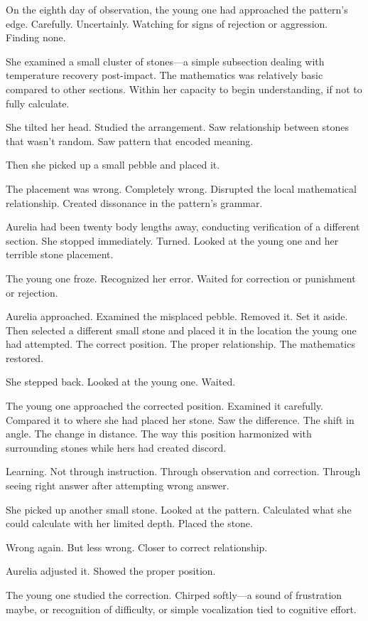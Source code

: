 On the eighth day of observation, the young one had approached the pattern's edge. Carefully. Uncertainly. Watching for signs of rejection or aggression. Finding none.

She examined a small cluster of stones—a simple subsection dealing with temperature recovery post-impact. The mathematics was relatively basic compared to other sections. Within her capacity to begin understanding, if not to fully calculate.

She tilted her head. Studied the arrangement. Saw relationship between stones that wasn't random. Saw pattern that encoded meaning.

Then she picked up a small pebble and placed it.

The placement was wrong. Completely wrong. Disrupted the local mathematical relationship. Created dissonance in the pattern's grammar.

Aurelia had been twenty body lengths away, conducting verification of a different section. She stopped immediately. Turned. Looked at the young one and her terrible stone placement.

The young one froze. Recognized her error. Waited for correction or punishment or rejection.

Aurelia approached. Examined the misplaced pebble. Removed it. Set it aside. Then selected a different small stone and placed it in the location the young one had attempted. The correct position. The proper relationship. The mathematics restored.

She stepped back. Looked at the young one. Waited.

The young one approached the corrected position. Examined it carefully. Compared it to where she had placed her stone. Saw the difference. The shift in angle. The change in distance. The way this position harmonized with surrounding stones while hers had created discord.

Learning. Not through instruction. Through observation and correction. Through seeing right answer after attempting wrong answer.

She picked up another small stone. Looked at the pattern. Calculated what she could calculate with her limited depth. Placed the stone.

Wrong again. But less wrong. Closer to correct relationship.

Aurelia adjusted it. Showed the proper position.

The young one studied the correction. Chirped softly—a sound of frustration maybe, or recognition of difficulty, or simple vocalization tied to cognitive effort.


